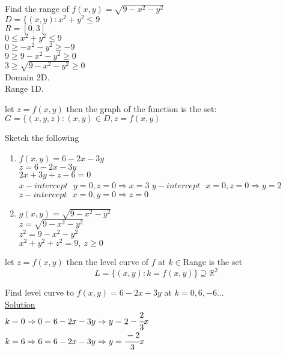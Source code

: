 
\begin{example}
Find the range of $f(x,y)=\sqrt{9-x^2-y^2}$\\
$D=\{(x,y):x^2+y^2\leq 9$\\
$R=[0,3]$\\
$0\leq x^2+y^2\leq 9$\\
$0\geq -x^2-y^2\geq -9$\\
$9\geq 9-x^2-y^2\geq 0$\\
$3\geq \sqrt{9-x^2-y^2}\geq 0$\\
Domain 2D.\\
Range 1D.
\end{example}
\noindent{\color{smalt(darkpowderblue)}\rule{\linewidth}{.2mm}}

\begin{definition}
let $z=f(x,y)$ then the graph of the function is the set:\\
$G=\{(x,y,z):(x,y)\in D,z=f(x,y)$
\end{definition}
\begin{example}
Sketch the following 
\begin{enumerate}
    \item $f(x,y)=6-2x-3y$\\
    $z=6-2x-3y$\\
    $2x+3y+z-6=0$\\
    $x-intercept~~~y=0,z=0\Rightarrow x=3$
    $y-intercept~~~x=0,z=0\Rightarrow y=2$
    $z-intercept~~~x=0,y=0\Rightarrow z=0$
    \item $g(x,y)=\sqrt{9-x^2-y^2}$\\
    $z=\sqrt{9-x^2-y^2}$\\
    $z^2=9-x^2-y^2$\\
    $x^2+y^2+z^2=9,~z\geq0$
\end{enumerate}
\end{example}
\noindent{\color{smalt(darkpowderblue)}\rule{\linewidth}{.2mm}}
\begin{definition}
let $z=f(x,y)$ then the level curve of $f$ at $k\in $Range is the set 
$$L=\{(x,y):k=f(x,y)\}\supseteq\mathbb{R}^2$$
\end{definition}
\begin{example}
Find level curve to $f(x,y)=6-2x-3y$ at $k=0,6,-6...$\\
\underline{\textbf{\large}\color{smalt(darkpowderblue)}Solution}\\
 $k=0\Rightarrow 0=6-2x-3y\Rightarrow y=2-\cfrac{2}{3}x$\\
$k=6\Rightarrow 6=6-2x-3y\Rightarrow y=\cfrac{-2}{3}x$
\end{example}

